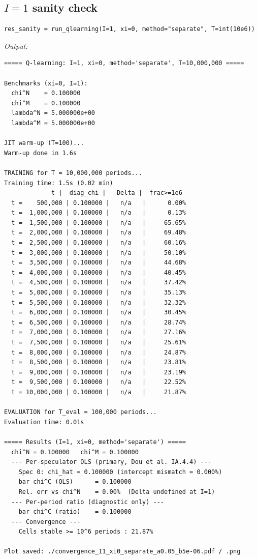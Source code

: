 \subsection{$I=1$ sanity check}

\begin{lstlisting}[style=pythonstyle]
res_sanity = run_qlearning(I=1, xi=0, method="separate", T=int(10e6))
\end{lstlisting}

\noindent\textit{Output:}
\begin{lstlisting}[style=outputstyle]
===== Q-learning: I=1, xi=0, method='separate', T=10,000,000 =====

Benchmarks (xi=0, I=1):
  chi^N    = 0.100000
  chi^M    = 0.100000
  lambda^N = 5.000000e+00
  lambda^M = 5.000000e+00

JIT warm-up (T=100)...
Warm-up done in 1.6s

TRAINING for T = 10,000,000 periods...
Training time: 1.5s (0.02 min)
             t |  diag_chi |   Delta |  frac>=1e6
  t =    500,000 | 0.100000 |   n/a   |      0.00%
  t =  1,000,000 | 0.100000 |   n/a   |      0.13%
  t =  1,500,000 | 0.100000 |   n/a   |     65.65%
  t =  2,000,000 | 0.100000 |   n/a   |     69.48%
  t =  2,500,000 | 0.100000 |   n/a   |     60.16%
  t =  3,000,000 | 0.100000 |   n/a   |     50.10%
  t =  3,500,000 | 0.100000 |   n/a   |     44.68%
  t =  4,000,000 | 0.100000 |   n/a   |     40.45%
  t =  4,500,000 | 0.100000 |   n/a   |     37.42%
  t =  5,000,000 | 0.100000 |   n/a   |     35.13%
  t =  5,500,000 | 0.100000 |   n/a   |     32.32%
  t =  6,000,000 | 0.100000 |   n/a   |     30.45%
  t =  6,500,000 | 0.100000 |   n/a   |     28.74%
  t =  7,000,000 | 0.100000 |   n/a   |     27.16%
  t =  7,500,000 | 0.100000 |   n/a   |     25.61%
  t =  8,000,000 | 0.100000 |   n/a   |     24.87%
  t =  8,500,000 | 0.100000 |   n/a   |     23.81%
  t =  9,000,000 | 0.100000 |   n/a   |     23.19%
  t =  9,500,000 | 0.100000 |   n/a   |     22.52%
  t = 10,000,000 | 0.100000 |   n/a   |     21.87%

EVALUATION for T_eval = 100,000 periods...
Evaluation time: 0.01s

===== Results (I=1, xi=0, method='separate') =====
  chi^N = 0.100000   chi^M = 0.100000
  --- Per-speculator OLS (primary, Dou et al. IA.4.4) ---
    Spec 0: chi_hat = 0.100000 (intercept mismatch = 0.000%)
    bar_chi^C (OLS)      = 0.100000
    Rel. err vs chi^N    = 0.00%  (Delta undefined at I=1)
  --- Per-period ratio (diagnostic only) ---
    bar_chi^C (ratio)    = 0.100000
  --- Convergence ---
    Cells stable >= 10^6 periods : 21.87%

Plot saved: ./convergence_I1_xi0_separate_a0.05_b5e-06.pdf / .png
\end{lstlisting}

